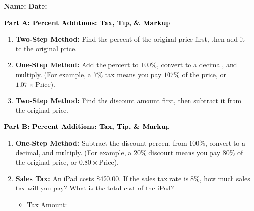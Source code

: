 \documentclass[12pt, letterpaper, fleqn]{article}
\newcommand{\blank}{\underline{\hspace{2.2cm}}}
\begin{document}
\textbf{Name:} \underline{\hspace{5cm}}
\hfill
\textbf{Date:} \underline{\hspace{3cm}}\\

\begin{tcolorbox}[colback=customteal!20]
\large\textcolor{black}{\textbf{Part A: Percent Additions: Tax, Tip, \& Markup}}
\end{tcolorbox}

\vspace{3mm}

\begin{enumerate}[itemsep=2.2cm, leftmargin=0.6cm]
\item \textbf{Two-Step Method:} Find the percent of the original price first, then add it to the original price.
\item \textbf{One-Step Method:} Add the percent to $100\%$, convert to a decimal, and multiply. (For example, a $7\%$ tax means you pay $107\%$ of the price, or $1.07 \times \text{Price}$).
\item \textbf{Two-Step Method:} Find the discount amount first, then subtract it from the original price.
\end{enumerate}

\newpage

\begin{tcolorbox}[colback=customteal!20]
\large\textcolor{black}{\textbf{Part B: Percent Additions: Tax, Tip, \& Markup}}
\end{tcolorbox}

\vspace{3mm}

\begin{enumerate}[itemsep=2.2cm, leftmargin=0.6cm, resume]
\item \textbf{One-Step Method:} Subtract the discount percent from $100\%$, convert to a decimal, and multiply. (For example, a $20\%$ discount means you pay $80\%$ of the original price, or $0.80 \times \text{Price}$).
\item \textbf{Sales Tax:} An iPad costs $\$420.00$. If the sales tax rate is $8\%$, how much sales tax will you pay? What is the total cost of the iPad?
\vspace{1.5cm}
\begin{itemize}
\item Tax Amount: \blank
\end{itemize}
\end{enumerate}
\end{document}
